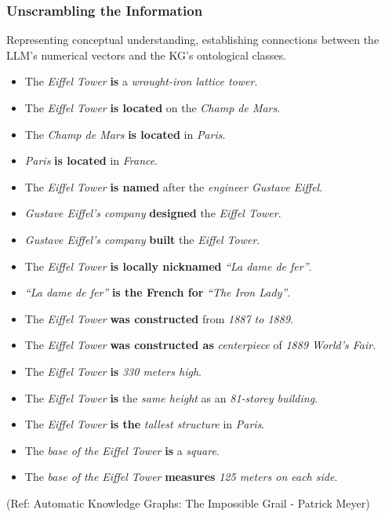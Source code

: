 \begin{frame}[fragile]\frametitle{Unscrambling the Information}

Representing conceptual understanding, establishing connections between the LLM's numerical vectors and the KG's ontological classes.

\begin{itemize}
\item The {\it Eiffel Tower} {\bf is} a {\it wrought-iron lattice tower}.
\item The {\it Eiffel Tower} {\bf is located} on the {\it Champ de Mars}.
\item The {\it Champ de Mars} {\bf is located} in {\it Paris}.
\item {\it Paris} {\bf is located} in {\it France}.
\item The {\it Eiffel Tower} {\bf is named} after the {\it engineer Gustave Eiffel}.
\item {\it Gustave Eiffel’s company} {\bf designed} the {\it Eiffel Tower}.
\item {\it Gustave Eiffel’s company} {\bf built} the {\it Eiffel Tower}.
\item The {\it Eiffel Tower} {\bf is locally nicknamed} {\it ``La dame de fer''}.
\item {\it ``La dame de fer''} {\bf is the French for} {\it ``The Iron Lady''}.
\item The {\it Eiffel Tower} {\bf was constructed} from {\it 1887 to 1889}.
\item The {\it Eiffel Tower} {\bf was constructed as} {\it centerpiece} of {\it 1889 World’s Fair}.
\item The {\it Eiffel Tower} {\bf is} {\it 330 meters high}.
\item The {\it Eiffel Tower} {\bf is} the {\it same height} as an {\it 81-storey building}.
\item The {\it Eiffel Tower} {\bf is the} {\it tallest structure} in {\it Paris}.
\item The {\it base of the Eiffel Tower} {\bf is} a {\it square}.
\item The {\it base of the Eiffel Tower} {\bf measures} {\it 125 meters on each side}.
\end{itemize}

{\tiny (Ref: Automatic Knowledge Graphs: The Impossible Grail - Patrick Meyer)}

\end{frame}

